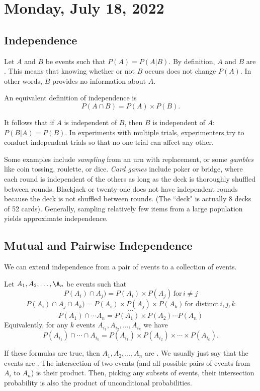\section{Monday, July 18, 2022}

\subsection{Independence}

Let $A$ and $B$ be events such that $P(A) = P(A|B)$. By definition, $A$ and $B$ are . This means that knowing whether or not $B$ occurs does not change $P(A)$. In other words, $B$ provides no information about $A$.

An equivalent definition of independence is $$P(A \cap B) = P(A) \times P(B).$$

It follows that if $A$ is independent of $B$, then $B$ is independent of $A$: $P(B|A) = P(B)$. In experiments with multiple trials, experimenters try to conduct independent trials so that no one trial can affect any other.

Some examples include \textit{sampling} from an urn with replacement, or some \textit{gambles} like coin tossing, roulette, or dice. \textit{Card games} include poker or bridge, where each round is independent of the others as long as the deck is thoroughly shuffled between rounds. Blackjack or twenty-one does not have independent rounds because the deck is not shuffled between rounds. (The ``deck" is actually 8 decks of 52 cards). Generally, sampling relatively few items from a large population yields approximate independence.

\subsection{Mutual and Pairwise Independence}
We can extend independence from a pair of events to a collection of events.

Let $A_{1}, A_{2}, \ldots, \A_{n}$ be events such that $$P(A_{i}) \cap A_{j}) = P(A_{i}) \times P(A_{j}) \, \text{for} \, i \neq j$$
$$P(A_{i}) \cap A_{j} \cap A_{k}) = P(A_{i}) \times P(A_{j}) \times P(A_{k}) \, \text{for distinct} \, i, j, k$$
$$\cdots$$
$$P(A_{1}) \cap \cdots A_{n} = P(A_{1}) \times P(A_{2}) \cdots P(A_{n})$$
Equivalently, for any $k$ events $A_{i}_{1}, A_{i}_{2}, \ldots, A_{i}_{k}$ we have $$P(A_{i}_{1}) \cap \cdots \cap A_{i}_{k} = P(A_{i}_{1}) \times P(A_{i}_{2}) \times \cdots \times P(A_{i}_{k}).$$

If these formulas are true, then $A_{1}, A_{2}, \ldots, A_{n}$ are . We usually just say that the events are . The intersection of two events (and all possible pairs of events from $A_{i}$ to $A_{n}$) is their product. Then, picking any subsets of events, their intersection probability is also the product of unconditional probabilities.

